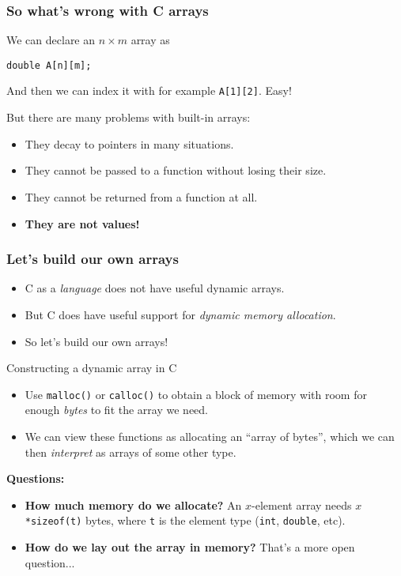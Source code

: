 \documentclass[rgb,dvipsnames,aspectratio=169,xcolor=table]{beamer}
\begin{document}
\begin{frame}[fragile]
  \frametitle{So what's wrong with C arrays}

  We can declare an $n\times{}m$ array as

\begin{lstlisting}
double A[n][m];
\end{lstlisting}

And then we can index it with for example \lstinline{A[1][2]}.  Easy!

\pause

\bigskip

But there are many problems with built-in arrays:

\begin{itemize}
\item They decay to pointers in many situations.
\item They cannot be passed to a function without losing their size.
\item They cannot be returned from a function at all.
\item \textbf{They are not values!}
\end{itemize}

\end{frame}

\begin{frame}
  \frametitle{Let's build our own arrays}

  \begin{itemize}
  \item C as a \textit{language} does not have useful dynamic arrays.
  \item But C does have useful support for \textit{dynamic memory
      allocation}.
  \item So let's build our own arrays!
  \end{itemize}

  \begin{block}{Constructing a dynamic array in C}
    \begin{itemize}
    \item Use \texttt{malloc()} or \texttt{calloc()} to obtain a block of
      memory with room for enough \textit{bytes} to fit the array we
      need.
    \item We can view these functions as allocating an ``array of
      bytes'', which we can then \textit{interpret} as arrays of some
      other type.
    \end{itemize}
  \end{block}

  \pause
  \bigskip\textbf{Questions:}

  \begin{itemize}
  \item\textbf{How much memory do we allocate?}  An $x$-element array
    needs \texttt{$x$*sizeof(t)} bytes, where \texttt{t} is the
    element type (\texttt{int}, \texttt{double}, etc).\pause
  \item\textbf{How do we lay out the array in memory?}  That's a more
    open question...
  \end{itemize}

\end{frame}
\end{document}
